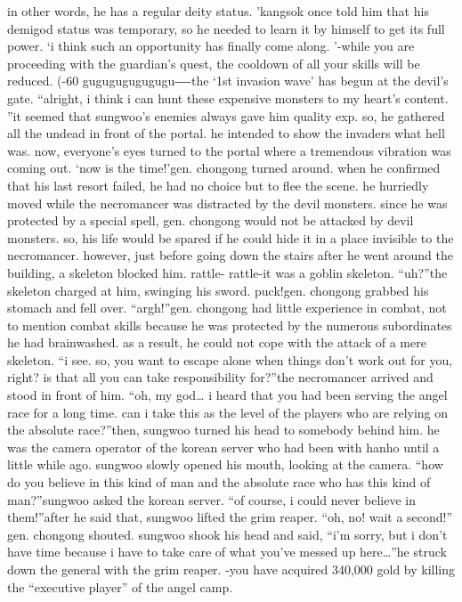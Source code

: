  in other words, he has a regular deity status.
’kangsok once told him that his demigod status was temporary, so he needed to learn it by himself to get its full power.
‘i think such an opportunity has finally come along.
’-while you are proceeding with the guardian’s quest, the cooldown of all your skills will be reduced.
 (-60%
gugugugugugugu―-the ‘1st invasion wave’ has begun at the devil’s gate.
“alright, i think i can hunt these expensive monsters to my heart’s content.
”it seemed that sungwoo’s enemies always gave him quality exp.
so, he gathered all the undead in front of the portal.
 he intended to show the invaders what hell was.
now, everyone’s eyes turned to the portal where a tremendous vibration was coming out.
‘now is the time!’gen.
 chongong turned around.
 when he confirmed that his last resort failed, he had no choice but to flee the scene.
 he hurriedly moved while the necromancer was distracted by the devil monsters.
 since he was protected by a special spell, gen.
 chongong would not be attacked by devil monsters.
 so, his life would be spared if he could hide it in a place invisible to the necromancer.
however, just before going down the stairs after he went around the building, a skeleton blocked him.
rattle- rattle-it was a goblin skeleton.
“uh?”the skeleton charged at him, swinging his sword.
puck!gen.
 chongong grabbed his stomach and fell over.
“argh!”gen.
 chongong had little experience in combat, not to mention combat skills because he was protected by the numerous subordinates he had brainwashed.
as a result, he could not cope with the attack of a mere skeleton.
“i see.
 so, you want to escape alone when things don’t work out for you, right? is that all you can take responsibility for?”the necromancer arrived and stood in front of him.
“oh, my god… i heard that you had been serving the angel race for a long time.
 can i take this as the level of the players who are relying on the absolute race?”then, sungwoo turned his head to somebody behind him.
 he was the camera operator of the korean server who had been with hanho until a little while ago.
sungwoo slowly opened his mouth, looking at the camera.
“how do you believe in this kind of man and the absolute race who has this kind of man?”sungwoo asked the korean server.
“of course, i could never believe in them!”after he said that, sungwoo lifted the grim reaper.
“oh, no! wait a second!” gen.
 chongong shouted.
sungwoo shook his head and said, “i’m sorry, but i don’t have time because i have to take care of what you’ve messed up here…”he struck down the general with the grim reaper.
-you have acquired 340,000 gold by killing the “executive player” of the angel camp.


